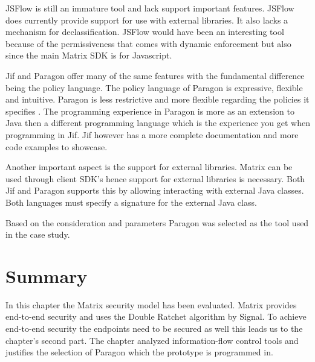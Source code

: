 JSFlow is still an immature tool and lack support important features. JSFlow does currently provide support for use with external libraries. It also lacks a mechanism for declassification. JSFlow would have been an interesting tool because of the permissiveness that comes with dynamic enforcement but also since the main Matrix SDK is for Javascript. 

Jif and Paragon offer many of the same features with the fundamental difference being the policy language. The policy language of Paragon is expressive, flexible and intuitive. Paragon is less restrictive and more flexible regarding the policies it specifies \cite{paragonpaper}. The programming experience in Paragon is more as an extension to Java then a different programming language which is the experience you get when programming in Jif. Jif however has a more complete documentation and more code examples to showcase. 

Another important aspect is the support for external libraries. Matrix can be used through client SDK's hence support for external libraries is necessary. Both Jif and Paragon supports this by allowing interacting with external Java classes. Both languages must specify a signature for the external Java class. %

Based on the consideration and parameters Paragon was selected as the tool used in the case study. 


\section{Summary}
In this chapter the Matrix security model has been evaluated. Matrix provides end-to-end security and uses the Double Ratchet algorithm by Signal. To achieve end-to-end security the endpoints need to be secured as well \cite{Sabelfeld2003} this leads us to the chapter's second part. The chapter analyzed information-flow control tools and justifies the selection of Paragon which the prototype is programmed in. 